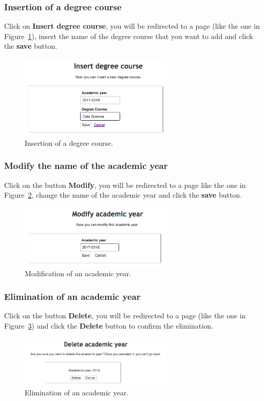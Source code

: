 \subsubsection{Insertion of a degree course}
Click on \textbf{Insert degree course}, you will be redirected to a page (like the one in Figure~\ref{fig:degreeInsertion}), insert the name of the degree course that you want to add and click the \textbf{save} button.
\begin{figure}[!h]
  \centering
  \includegraphics[width=0.65\textwidth]{img/degreeInsertion.png}
  \caption{Insertion of a degree course.}
  \label{fig:degreeInsertion}
\end{figure}

\subsubsection{Modify the name of the academic year}
Click on the button \textbf{Modify}, you will be redirected to a page like the one in Figure~\ref{fig:modifyAcademicYear}, change the name
of the academic year and click the \textbf{save} button.
\begin{figure}[!h]
  \centering
  \includegraphics[width=0.65\textwidth]{img/modifyAcademicYear.png}
  \caption{Modification of an academic year.}
  \label{fig:modifyAcademicYear}
\end{figure}

\subsubsection{Elimination of an academic year}
Click on the button \textbf{Delete}, you will be redirected to a page (like the one in Figure~\ref{fig:deleteAcademicYear}) and click the \textbf{Delete} button to confirm the elimination.
\begin{figure}[!h]
  \centering
  \includegraphics[width=0.65\textwidth]{img/deleteAcademicYear.png}
  \caption{Elimination of an academic year.}
  \label{fig:deleteAcademicYear}
\end{figure}

